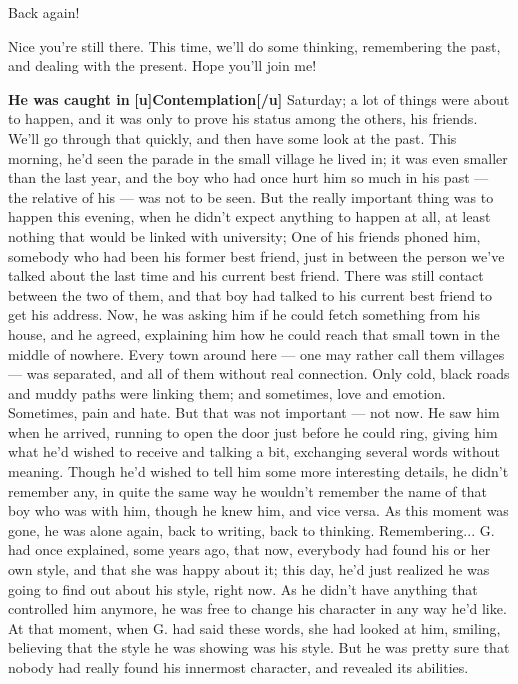 Back again!

Nice you're still there. This time, we'll do some thinking, remembering the past, and dealing with the present. Hope you'll join me!

\textbf{He was caught in}
\textbf{[u]Contemplation[/u]}
Saturday; a lot of things were about to happen, and it was only to prove his status among the others, his friends. We'll go through that quickly, and then have some look at the past. 
This morning, he'd seen the parade in the small village he lived in; it was even smaller than the last year, and the boy who had once hurt him so much in his past --- the relative of his --- was not to be seen. But the really important thing was to happen this evening, when he didn't expect anything to happen at all, at least nothing that would be linked with university; One of his friends phoned him, somebody who had been his former best friend, just in between the person we've talked about the last time and his current best friend. There was still contact between the two of them, and that boy had talked to his current best friend to get his address. Now, he was asking him if he could fetch something from his house, and he agreed, explaining him how he could reach that small town in the middle of nowhere. Every town around here --- one may rather call them villages --- was separated, and all of them without real connection. Only cold, black roads and muddy paths were linking them; and sometimes, love and emotion. 
Sometimes, pain and hate. But that was not important --- not now. He saw him when he arrived, running to open the door just before he could ring, giving him what he'd wished to receive and talking a bit, exchanging several words without meaning. Though he'd wished to tell him some more interesting details, he didn't remember any, in quite the same way he wouldn't remember the name of that boy who was with him, though he knew him, and vice versa. 
As this moment was gone, he was alone again, back to writing, back to thinking. 
Remembering...
G. had once explained, some years ago, that now, everybody had found his or her own style, and that she was happy about it; this day, he'd just realized he was going to find out about his style, right now. As he didn't have anything that controlled him anymore, he was free to change his character in any way he'd like. At that moment, when G. had said these words, she had looked at him, smiling, believing that the style he was showing was his style. But he was pretty sure that nobody had really found his innermost character, and revealed its abilities. 
